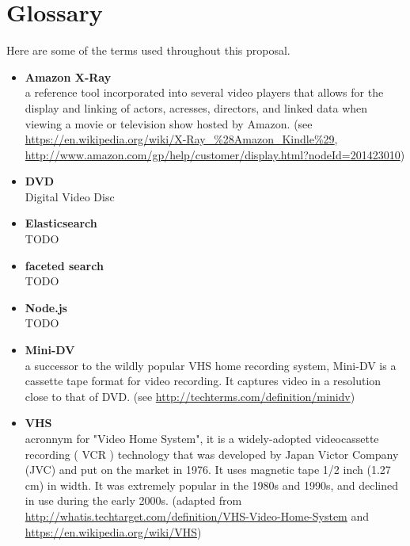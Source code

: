 %
\pagestyle{empty}
\hfill
{}
\section*{Glossary}

Here are some of the terms used throughout this proposal.

\begin{itemize}[leftmargin=*]
\item \textbf{Amazon X-Ray} \\
	a reference tool incorporated into several video players that allows for the display and linking of actors, acresses, directors, and linked data when viewing a movie or television show hosted by Amazon. (see \url{https://en.wikipedia.org/wiki/X-Ray_%28Amazon_Kindle%29}, \url{http://www.amazon.com/gp/help/customer/display.html?nodeId=201423010})
\item \textbf{DVD} \\
	Digital Video Disc
\item \textbf{Elasticsearch} \\
	TODO
\item \textbf{faceted search} \\
	TODO
\item \textbf{Node.js} \\
	TODO
\item \textbf{Mini-DV} \\
	a successor to the wildly popular VHS home recording system, Mini-DV is a cassette tape format for video recording. It captures video in a resolution close to that of DVD. (see \url{http://techterms.com/definition/minidv})
\item \textbf{VHS} \\
	acronnym for "Video Home System", it is a widely-adopted videocassette recording ( VCR ) technology that was developed by Japan Victor Company (JVC) and put on the market in 1976. It uses magnetic tape 1/2 inch (1.27 cm) in width.  It was extremely popular in the 1980s and 1990s, and declined in use during the early 2000s. (adapted from \url{http://whatis.techtarget.com/definition/VHS-Video-Home-System} and \url{https://en.wikipedia.org/wiki/VHS})
\end{itemize}
